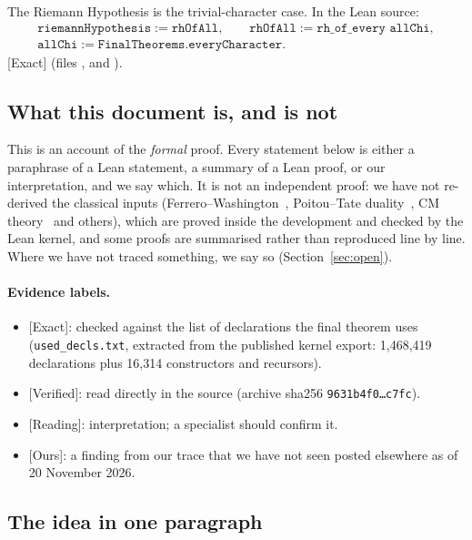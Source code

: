 \documentclass[11pt]{article}
\newcommand{\Exact}{\textcolor{exactc}{\textsf{\small[Exact]}}}
\newcommand{\Verified}{\textcolor{verc}{\textsf{\small[Verified]}}}
\newcommand{\Reading}{\textcolor{readc}{\textsf{\small[Reading]}}}
\newcommand{\Ours}{\textcolor{oursc}{\textsf{\small[Ours]}}}
\theoremstyle{plain}
\theoremstyle{definition}
\begin{document}
The Riemann Hypothesis is the trivial-character case. In the Lean source:
\begin{gather*}
\texttt{riemannHypothesis} := \texttt{rhOfAll},\qquad
\texttt{rhOfAll} := \texttt{rh\_of\_every allChi},\\
\texttt{allChi} := \texttt{FinalTheorems.everyCharacter}.
\end{gather*}
\Exact{} (files ,  and ).

\subsection{What this document is, and is not}

This is an account of the \emph{formal} proof. Every statement below is either a paraphrase of a Lean
statement, a summary of a Lean proof, or our interpretation, and we say which. It is not an
independent proof: we have not re-derived the classical inputs (Ferrero--Washington~\cite{ferrero-washington},
Poitou--Tate duality~\cite{nsw}, CM theory~\cite{shimura} and others), which are proved inside the development and checked by the Lean
kernel, and some proofs are summarised rather than reproduced line by line. Where we have not traced
something, we say so (Section~\ref{sec:open}).

\paragraph{Evidence labels.}
\begin{itemize}
\item \Exact: checked against the list of declarations the final theorem uses
  (\texttt{used\_decls.txt}, extracted from the published kernel export: 1{,}468{,}419 declarations
  plus 16{,}314 constructors and recursors).
\item \Verified: read directly in the source (archive sha256 \texttt{9631b4f0\ldots c7fc}).
\item \Reading: interpretation; a specialist should confirm it.
\item \Ours: a finding from our trace that we have not seen posted elsewhere as of 20 November 2026.
\end{itemize}

\subsection{The idea in one paragraph}
\end{document}
